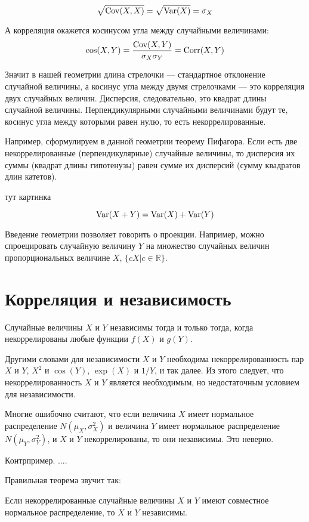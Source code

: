 \documentclass[10pt]{article}
\newcommand{\RR}{\mathbb{R}}
\begin{document}
\[
\sqrt{\operatorname{Cov}(X,X)}=\sqrt{\operatorname{Var}(X)}=\sigma_X
\]

А корреляция окажется косинусом угла между случайными величинами:
\[
\cos(X,Y)=\frac{\operatorname{Cov}(X,Y)}{\sigma_X\sigma_Y}=\operatorname{Corr}(X,Y)
\]


Значит в нашей геометрии  длина стрелочки --- стандартное отклонение случайной величины, а косинус угла между двумя стрелочками --- это корреляция двух случайных величин. Дисперсия, следовательно, это квадрат длины случайной величины. Перпендикулярными случайными величинами будут те, косинус угла между которыми равен нулю, то есть некоррелированные.

Например, сформулируем в данной геометрии теорему Пифагора. Если есть две некоррелированные (перпендикулярные) случайные величины, то дисперсия их суммы (квадрат длины гипотенузы) равен сумме их дисперсий (сумму квадратов длин катетов).


тут картинка

\[
\operatorname{Var}(X+Y)=\operatorname{Var}(X)+\operatorname{Var}(Y)
\]

Введение геометрии позволяет говорить о проекции. Например, можно спроецировать случайную величину $Y$ на множество случайных величин пропорциональных величине $X$, $\{cX | c\in \RR \}$.



\section{Корреляция и независимость}

\begin{theorem}
Случайные величины $X$ и $Y$ независимы тогда и только тогда, когда некоррелированы любые функции $f(X)$ и $g(Y)$.
\end{theorem}

Другими словами для независимости $X$ и $Y$ необходима некоррелированность пар $X$ и $Y$, $X^2$ и $\cos(Y)$, $\exp(X)$ и $1/Y$, и так далее. Из этого следует, что некоррелированность $X$ и $Y$ является необходимым, но недостаточным условием для независимости.

Многие ошибочно считают, что если величина $X$ имеет нормальное распределение $N(\mu_X, \sigma^2_X)$ и величина $Y$ имеет нормальное распределение $N(\mu_Y, \sigma^2_Y)$, и $X$ и $Y$ некоррелированы, то они независимы. Это неверно.

Контрпример. ....

Правильная теорема звучит так:

\begin{theorem}
Если некоррелированные случайные величины $X$ и $Y$ имеют совместное нормальное распределение, то $X$ и $Y$ независимы.
\end{theorem}
\end{document}

